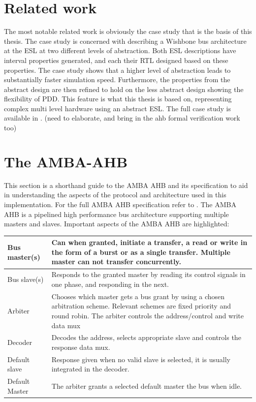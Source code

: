 \section{Related work}
\label{sec:related}
The most notable related work is obviously the case study that is the basis of this thesis. 
The case study is concerned with describing a Wishbone bus architecture at the ESL at two different levels of abstraction. 
Both ESL descriptions have interval properties generated, and each their RTL designed based on these properties. 
The case study shows that a higher level of abstraction leads to substantially faster simulation speed. Furthermore, 
the properties from the abstract design are then refined to hold on the less abstract design showing the flexibility of PDD. 
This feature is what this thesis is based on, representing complex multi level hardware using an abstract ESL. The full case study is available in \cite{pddref}.
(need to elaborate, and bring in the ahb formal verification work too)

\section{The AMBA-AHB}
\label{sec:ahb}

This section is a shorthand guide to the AMBA AHB and its specification to aid in understanding the aspects of the protocol and architecture used in this implementation. For the full AMBA AHB specification refer to \cite{amba}. The AMBA AHB is a pipelined high performance bus architecture supporting multiple masters and slaves. Important aspects of the AMBA AHB are highlighted:

\begin{tabular}{p{3cm} p{10cm}}
Bus master(s) & Can when granted, initiate a transfer, a read or write in the form of a burst or as a single transfer. Multiple master can not transfer concurrently. \\
\hline
Bus slave(s) & Responds to the granted master by reading its control signals in one phase, and responding in the next. \\
\hline
Arbiter & Chooses which master gets a bus grant by using a chosen arbitration scheme. Relevant schemes are fixed priority and round robin. The arbiter controls the address/control and write data mux \\
\hline
Decoder & Decodes the address, selects appropriate slave and controls the response data mux. \\
\hline
Default slave & Response given when no valid slave is selected, it is usually integrated in the decoder.\\
\hline
Default Master & The arbiter grants a selected default master the bus when idle. \\
\end{tabular}


